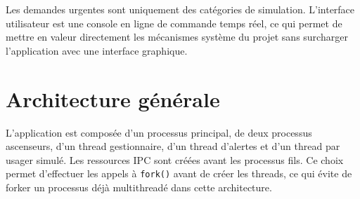\documentclass[11pt,a4paper]{article}
\begin{document}
Les demandes urgentes sont uniquement des catégories de simulation. L'interface utilisateur est une console en ligne de commande temps réel, ce qui permet de mettre en valeur directement les mécanismes système du projet sans surcharger l'application avec une interface graphique.

\section{Architecture générale}

L'application est composée d'un processus principal, de deux processus ascenseurs, d'un thread gestionnaire, d'un thread d'alertes et d'un thread par usager simulé. Les ressources IPC sont créées avant les processus fils. Ce choix permet d'effectuer les appels à \texttt{fork()} avant de créer les threads, ce qui évite de forker un processus déjà multithreadé dans cette architecture.
\end{document}
